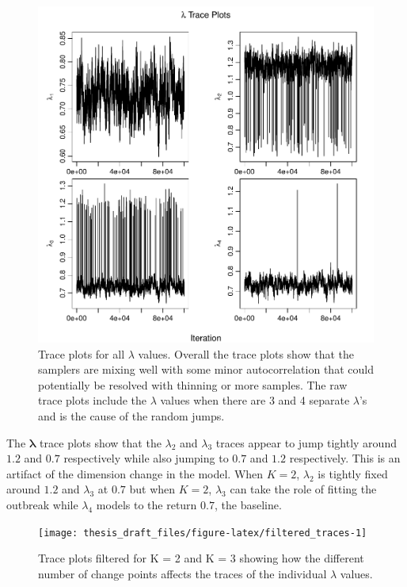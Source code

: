 \documentclass[11pt,a4paper]{article}
\begin{document}
\begin{figure}

{\centering \includegraphics[height=0.41\textheight]{thesis_draft_files/figure-latex/lambda_traces-1} 

}

\caption{Trace plots for all $\lambda$ values. Overall the trace plots show that the samplers are mixing well with some minor autocorrelation that could potentially be resolved with thinning or more samples. The raw trace plots include the $\lambda$ values when there are 3 and 4 separate $\lambda$'s and is the cause of the random jumps.}\label{fig:lambda_traces}
\end{figure}

The \(\boldsymbol{\lambda}\) trace plots show that the \(\lambda_2\) and
\(\lambda_3\) traces appear to jump tightly around \(1.2\) and \(0.7\)
respectively while also jumping to \(0.7\) and \(1.2\) respectively.
This is an artifact of the dimension change in the model. When
\(K = 2\), \(\lambda_2\) is tightly fixed around \(1.2\) and
\(\lambda_3\) at \(0.7\) but when \(K = 2\), \(\lambda_3\) can take the
role of fitting the outbreak while \(\lambda_4\) models to the return
\(0.7\), the baseline.

\begin{figure}

{\centering \texttt{[image: thesis\_draft\_files/figure-latex/filtered\_traces-1]} 

}

\caption{Trace plots filtered for K = 2 and K = 3 showing how the different number of change points affects the traces of the individual $\lambda$ values.}\label{fig:filtered_traces}
\end{figure}
\end{document}
